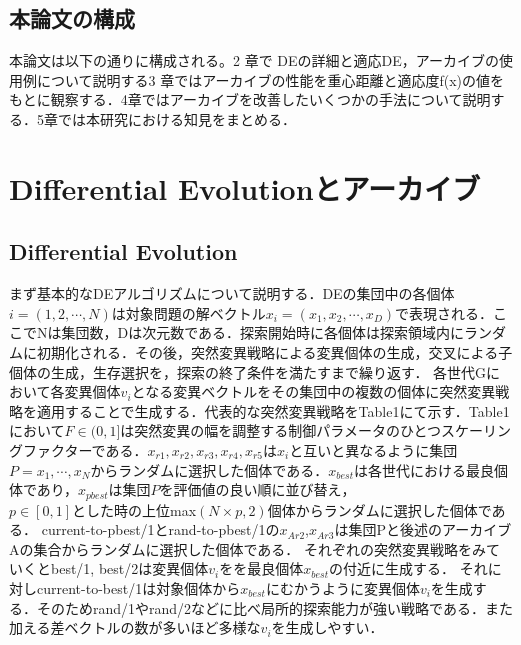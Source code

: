 \documentclass[a4paper,11pt,oneside,openany]{jsbook}
\begin{document}
\section{本論文の構成}
本論文は以下の通りに構成される。2 章で DEの詳細と適応DE，アーカイブの使用例について説明する3 章ではアーカイブの性能を重心距離と適応度f(x)の値をもとに観察する．4章ではアーカイブを改善したいくつかの手法について説明する．5章では本研究における知見をまとめる．

\chapter{Differential Evolutionとアーカイブ}
\section{Differential Evolution}
まず基本的なDEアルゴリズムについて説明する．DEの集団中の各個体${i} = (1, 2, \cdots, N)$は対象問題の解ベクトル${x_i} = (x_1, x_2, \cdots, x_D)$で表現される．ここでNは集団数，Dは次元数である．探索開始時に各個体は探索領域内にランダムに初期化される．その後，突然変異戦略による変異個体の生成，交叉による子個体の生成，生存選択を，探索の終了条件を満たすまで繰り返す．
各世代Gにおいて各変異個体${v_i}$となる変異ベクトルをその集団中の複数の個体に突然変異戦略を適用することで生成する．代表的な突然変異戦略をTable1にて示す．Table1において${F\in(0,1]}$は突然変異の幅を調整する制御パラメータのひとつスケーリングファクターである．$x_{r1},x_{r2},x_{r3},x_{r4},x_{r5}$は${x_i}$と互いと異なるように集団$P = {x_1, \cdots, x_N}$からランダムに選択した個体である．$x_{best}$は各世代における最良個体であり，$x_{pbest}$は集団$P$を評価値の良い順に並び替え，${p\in[0,1]}とした時の上位$max$(N \times p, 2)$個体からランダムに選択した個体である．
current-to-pbest/1とrand-to-pbest/1の${x_{Ar2}}$,${x_{Ar3}}$は集団Pと後述のアーカイブAの集合からランダムに選択した個体である．
それぞれの突然変異戦略をみていくとbest/1, best/2は変異個体{$v_i$}をを最良個体$x_{best}$の付近に生成する．
それに対しcurrent-to-best/1は対象個体から$x_{best}$にむかうように変異個体{$v_i$}を生成する．そのためrand/1やrand/2などに比べ局所的探索能力が強い戦略である．また加える差ベクトルの数が多いほど多様な{$v_i$}を生成しやすい．
\end{document}
